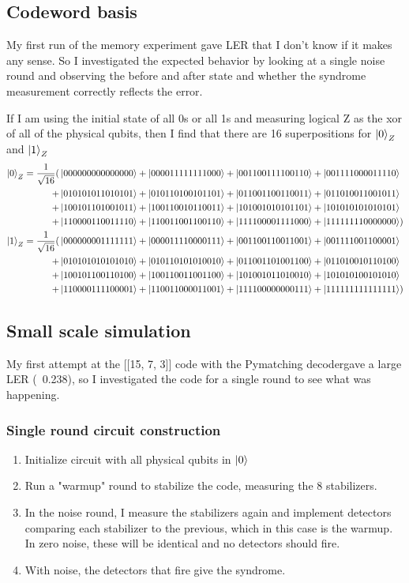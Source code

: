 \documentclass{article}
\begin{document}
\subsection{Codeword basis}
My first run of the memory experiment gave LER that I don't know if it makes any sense. So I investigated the expected behavior by looking at a single noise round and observing the before and after state and whether the syndrome measurement correctly reflects the error. 

If I am using the initial state of all 0s or all 1s and measuring logical Z as the xor of all of the physical qubits, then I find that there are 16 superpositions for $\ket0_Z$ and $\ket1_Z$
\begin{align*}
    \ket{0}_Z = \frac{1}{\sqrt{16}}(&\ket{000000000000000}+\ket{000011111111000}+\ket{001100111100110}+\ket{001111000011110}\\+&\ket{010101011010101}+\ket{010110100101101}+\ket{011001100110011}+\ket{011010011001011}\\+&\ket{100101101001011}+\ket{100110010110011}+\ket{101001010101101}+\ket{101010101010101}\\+&\ket{110000110011110}+\ket{110011001100110}+\ket{111100001111000}+\ket{111111110000000})
    \\\ket{1}_Z = \frac{1}{\sqrt{16}}(&\ket{000000001111111}+\ket{000011110000111}+\ket{001100110011001}+\ket{001111001100001}\\+&\ket{010101010101010}+\ket{010110101010010}+\ket{011001101001100}+\ket{011010010110100}\\+&\ket{100101100110100}+\ket{100110011001100}+\ket{101001011010010}+\ket{101010100101010}\\+&\ket{110000111100001}+\ket{110011000011001}+\ket{111100000000111}+\ket{111111111111111})
\end{align*}

\subsection{Small scale simulation}
My first attempt at the [[15, 7, 3]] code with the Pymatching decodergave a large LER (~0.238), so I investigated the code for a single round to see what was happening.

\subsubsection{Single round circuit construction}
\begin{enumerate}
    \item Initialize circuit with all physical qubits in $\ket{0}$
    \item Run a "warmup" round to stabilize the code, measuring the 8 stabilizers.
    \item In the noise round, I measure the stabilizers again and implement detectors comparing each stabilizer to the previous, which in this case is the warmup. In zero noise, these will be identical and no detectors should fire.
    \item With noise, the detectors that fire give the syndrome.
\end{enumerate}
\end{document}
